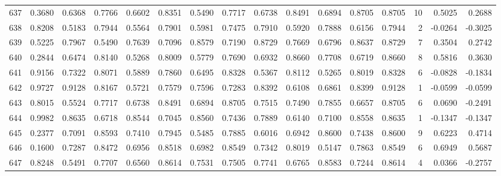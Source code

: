 \begin{tabular}{lrrrrrrrrrrrrrrr}
637 &      0.3680 &  0.6368 &  0.7766 &  0.6602 &  0.8351 &  0.5490 &  0.7717 &  0.6738 &  0.8491 &  0.6894 &   0.8705 &     0.8705 &     10 &                    0.5025 &                     0.2688 \\
638 &      0.8208 &  0.5183 &  0.7944 &  0.5564 &  0.7901 &  0.5981 &  0.7475 &  0.7910 &  0.5920 &  0.7888 &   0.6156 &     0.7944 &      2 &                   -0.0264 &                    -0.3025 \\
639 &      0.5225 &  0.7967 &  0.5490 &  0.7639 &  0.7096 &  0.8579 &  0.7190 &  0.8729 &  0.7669 &  0.6796 &   0.8637 &     0.8729 &      7 &                    0.3504 &                     0.2742 \\
640 &      0.2844 &  0.6474 &  0.8140 &  0.5268 &  0.8009 &  0.5779 &  0.7690 &  0.6932 &  0.8660 &  0.7708 &   0.6719 &     0.8660 &      8 &                    0.5816 &                     0.3630 \\
641 &      0.9156 &  0.7322 &  0.8071 &  0.5889 &  0.7860 &  0.6495 &  0.8328 &  0.5367 &  0.8112 &  0.5265 &   0.8019 &     0.8328 &      6 &                   -0.0828 &                    -0.1834 \\
642 &      0.9727 &  0.9128 &  0.8167 &  0.5721 &  0.7579 &  0.7596 &  0.7283 &  0.8392 &  0.6108 &  0.6861 &   0.8399 &     0.9128 &      1 &                   -0.0599 &                    -0.0599 \\
643 &      0.8015 &  0.5524 &  0.7717 &  0.6738 &  0.8491 &  0.6894 &  0.8705 &  0.7515 &  0.7490 &  0.7855 &   0.6657 &     0.8705 &      6 &                    0.0690 &                    -0.2491 \\
644 &      0.9982 &  0.8635 &  0.6718 &  0.8544 &  0.7045 &  0.8560 &  0.7436 &  0.7889 &  0.6140 &  0.7100 &   0.8558 &     0.8635 &      1 &                   -0.1347 &                    -0.1347 \\
645 &      0.2377 &  0.7091 &  0.8593 &  0.7410 &  0.7945 &  0.5485 &  0.7885 &  0.6016 &  0.6942 &  0.8600 &   0.7438 &     0.8600 &      9 &                    0.6223 &                     0.4714 \\
646 &      0.1600 &  0.7287 &  0.8472 &  0.6956 &  0.8518 &  0.6982 &  0.8549 &  0.7342 &  0.8019 &  0.5147 &   0.7863 &     0.8549 &      6 &                    0.6949 &                     0.5687 \\
647 &      0.8248 &  0.5491 &  0.7707 &  0.6560 &  0.8614 &  0.7531 &  0.7505 &  0.7741 &  0.6765 &  0.8583 &   0.7244 &     0.8614 &      4 &                    0.0366 &                    -0.2757 \\

\end{tabular}
